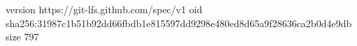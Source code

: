 version https://git-lfs.github.com/spec/v1
oid sha256:31987c1b51b92dd66fbdb1e815597dd9298e480ed8d65a9f28636ca2b0d4e9db
size 797
